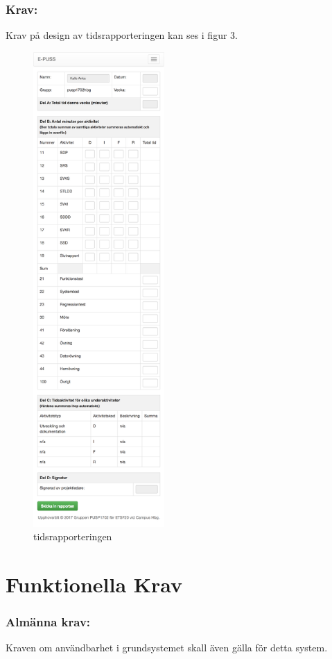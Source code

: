 \documentclass[paper=a4, fontsize=11pt,twoside]{article}
\begin{document}
\newpage
\subsubsection{Krav:} Krav på design av tidsrapporteringen kan ses i figur 3.
\begin{figure}[H]
\centering
\includegraphics[width=5cm]{prtscn-tidrapportering.png}
\caption{tidsrapporteringen}
\end{figure}


\section{Funktionella Krav}
\subsubsection{Almänna krav:}
Kraven om användbarhet i grundsystemet skall även gälla för detta system.
\end{document}
